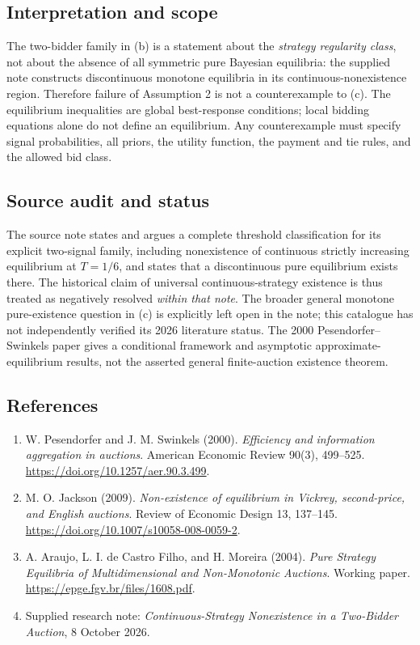 \documentclass[11pt,a4paper]{article}
\begin{document}
\subsection*{Interpretation and scope}

The two-bidder family in (b) is a statement about the \emph{strategy
	regularity class}, not about the absence of all symmetric pure
Bayesian equilibria: the supplied note constructs discontinuous
monotone equilibria in its continuous-nonexistence region. Therefore
failure of Assumption 2 is not a counterexample to (c).
The equilibrium inequalities are global best-response conditions;
local bidding equations alone do not define an equilibrium. Any
counterexample must specify signal probabilities, all priors, the
utility function, the payment and tie rules, and the allowed bid class.

\subsection*{Source audit and status}

The source note states and argues a complete threshold classification
for its explicit two-signal family, including nonexistence of
continuous strictly increasing equilibrium at $T=1/6$, and states
that a discontinuous pure equilibrium exists there. The historical
claim of universal continuous-strategy existence is thus treated as
negatively resolved \emph{within that note}. The broader general
monotone pure-existence question in (c) is explicitly left open in the
note; this catalogue has not independently verified its 2026
literature status. The 2000 Pesendorfer--Swinkels paper gives a
conditional framework and asymptotic approximate-equilibrium results,
not the asserted general finite-auction existence theorem.

\subsection*{References}

\begin{enumerate}
	\item[S1] W. Pesendorfer and J. M. Swinkels (2000).
	\emph{Efficiency and information aggregation in auctions}.
	American Economic Review 90(3), 499--525.
	\url{https://doi.org/10.1257/aer.90.3.499}.
	\item[S2] M. O. Jackson (2009).
	\emph{Non-existence of equilibrium in Vickrey, second-price, and
		English auctions}. Review of Economic Design 13, 137--145.
	\url{https://doi.org/10.1007/s10058-008-0059-2}.
	\item[S3] A. Araujo, L. I. de Castro Filho, and H. Moreira (2004).
	\emph{Pure Strategy Equilibria of Multidimensional and Non-Monotonic
		Auctions}. Working paper. \url{https://epge.fgv.br/files/1608.pdf}.
	\item[S4] Supplied research note: \emph{Continuous-Strategy
		Nonexistence in a Two-Bidder Auction}, 8 October 2026.
\end{enumerate}
\end{document}
